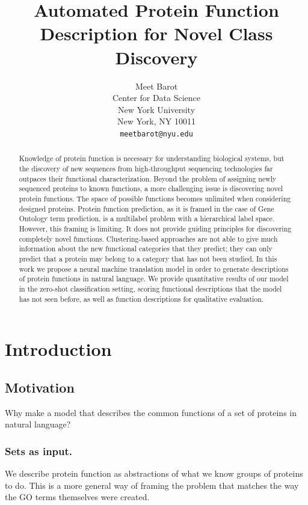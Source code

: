 \documentclass{article}
\title{Automated Protein Function Description for Novel Class Discovery}
\author{Meet Barot \\
        Center for Data Science\\
        New York University\\
        New York, NY 10011\\
        \texttt{meetbarot@nyu.edu}}
\begin{document}
\maketitle

\begin{abstract}
Knowledge of protein function is necessary for understanding biological systems, but the discovery of new sequences from high-throughput sequencing technologies far outpaces their functional characterization.
Beyond the problem of assigning newly sequenced proteins to known functions, a more challenging issue is discovering novel protein functions.
The space of possible functions becomes unlimited when considering designed proteins.
Protein function prediction, as it is framed in the case of Gene Ontology term prediction, is a multilabel problem with a hierarchical label space.
However, this framing is limiting. It does not provide guiding principles for discovering completely novel functions.
Clustering-based approaches are not able to give much information about the new functional categories that they predict; they can only predict that a protein may belong to a category that has not been studied.
In this work we propose a neural machine translation model in order to generate descriptions of protein functions in natural language.
We provide quantitative results of our model in the zero-shot classification setting, scoring functional descriptions that the model has not seen before, as well as function descriptions for qualitative evaluation.
\end{abstract}

\section{Introduction}

    \subsection{Motivation}
    Why make a model that describes the common functions of a set of proteins in natural language?
        \subsubsection{Sets as input.}
            We describe protein function as abstractions of what we know groups of proteins to do. This is a more general way of framing the problem that matches the way the GO terms themselves were created. %
\end{document}
